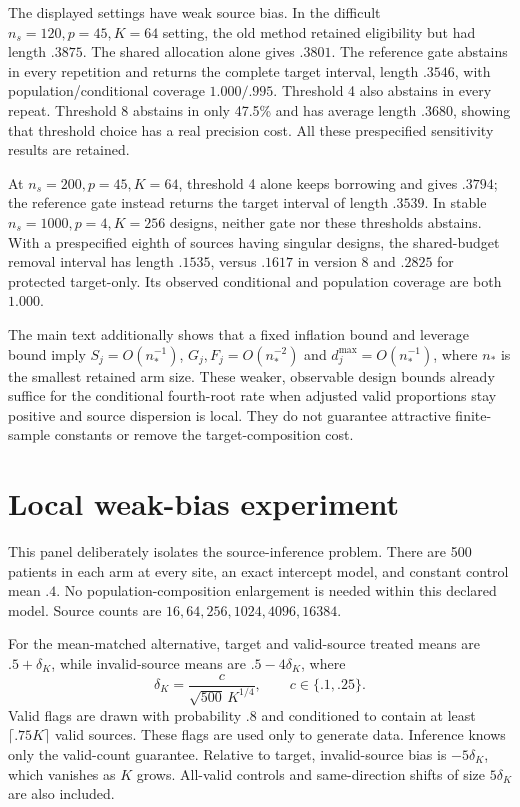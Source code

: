 \documentclass[11pt]{article}
\begin{document}
The displayed settings have weak source bias. In the difficult
$n_s=120,p=45,K=64$ setting, the old method retained eligibility but had
length $.3875$. The shared allocation alone gives $.3801$. The reference
gate abstains in every repetition and returns the complete target interval,
length $.3546$, with population/conditional coverage $1.000/.995$.
Threshold 4 also abstains in every repeat. Threshold 8 abstains in only
47.5\% and has average length $.3680$, showing that threshold choice has a
real precision cost. All these prespecified sensitivity results are retained.

At $n_s=200,p=45,K=64$, threshold 4 alone keeps borrowing and gives $.3794$;
the reference gate instead returns the target interval of length $.3539$.
In stable $n_s=1000,p=4,K=256$ designs, neither gate nor these thresholds
abstains. With a prespecified eighth of sources having singular designs,
the shared-budget removal interval has length $.1535$, versus $.1617$ in
version 8 and $.2825$ for protected target-only. Its observed conditional
and population coverage are both $1.000$.

The main text additionally shows that a fixed inflation bound and leverage
bound imply $S_j=O(n_*^{-1})$, $G_j,F_j=O(n_*^{-2})$ and
$d_j^{\max}=O(n_*^{-1})$, where $n_*$ is the smallest retained arm size.
These weaker, observable design bounds already suffice for the conditional
fourth-root rate when adjusted valid proportions stay positive and source
dispersion is local. They do not guarantee attractive finite-sample constants
or remove the target-composition cost.

\section{Local weak-bias experiment}

This panel deliberately isolates the source-inference problem. There are
500 patients in each arm at every site, an exact intercept model, and constant
control mean $.4$. No population-composition enlargement is needed within
this declared model. Source counts are $16,64,256,1024,4096,16384$.

For the mean-matched alternative, target and valid-source treated means are
$.5+\delta_K$, while invalid-source means are $.5-4\delta_K$, where
\[
 \delta_K=\frac{c}{\sqrt{500}\,K^{1/4}},\qquad c\in\{.1,.25\}.
\]
Valid flags are drawn with probability $.8$ and conditioned to contain at
least $\lceil.75K\rceil$ valid sources. These flags are used only to generate
data. Inference knows only the valid-count guarantee. Relative to target,
invalid-source bias is $-5\delta_K$, which vanishes as $K$ grows. All-valid
controls and same-direction shifts of size $5\delta_K$ are also included.
\end{document}
